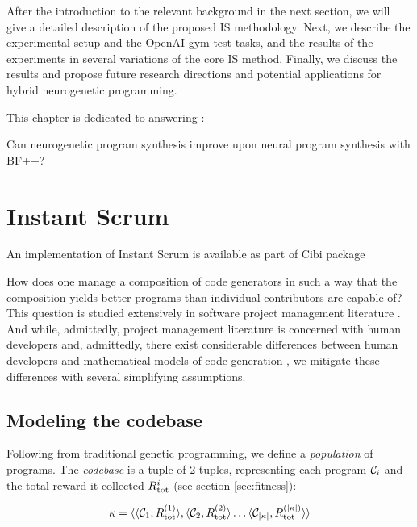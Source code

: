 After the introduction to the relevant background in the next section, we will give a detailed description of the proposed IS methodology. Next, we describe the experimental setup and the OpenAI gym test tasks, and the results of the experiments in several variations of the core IS method. Finally, we discuss the results and propose future research directions and potential applications for hybrid neurogenetic programming. 

This chapter is dedicated to answering \rqneurogen:

\begin{highlight}
    Can neurogenetic program synthesis improve upon neural program synthesis with BF++?
\end{highlight}

\newpage
\section{Instant Scrum}

\begin{remark}
    An implementation of Instant Scrum is available as part of Cibi \cite{liventsevVadim0x60Cibi2024} package
\end{remark}

How does one manage a composition of code generators in such a way that the composition yields better programs than individual contributors are capable of? 
This question is studied extensively in software project management literature \cite{mythicalmanmonth}.
And while, admittedly, project management literature is concerned with human developers and, admittedly, there exist considerable differences between human developers and mathematical models of code generation \cite{bugfixing}, we mitigate these differences with several simplifying assumptions.

\subsection{Modeling the codebase}

Following from traditional genetic programming, we define a \emph{population} of programs. 
The \emph{codebase} is a tuple of 2-tuples, representing each program $\mathcal{C}_i$ and the total reward it collected $R_\text{tot}^i$ (see section \ref{sec:fitness}):

\begin{equation}
    \kappa = \langle \langle \mathcal{C}_1, R_\text{tot}^{(1)} \rangle, \langle \mathcal{C}_2, R_\text{tot}^{(2)} \rangle \dots \langle \mathcal{C}_{|\kappa|}, R_\text{tot}^{(|\kappa|)} \rangle \rangle
\end{equation}

